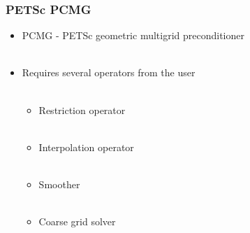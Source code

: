 \documentclass{beamer}
\begin{document}
\begin{frame}
\begin{center}
\frametitle{PETSc PCMG}

\begin{itemize}

\item PCMG - PETSc geometric multigrid preconditioner\\

~\\

\item Requires several operators from the user\\

~\\

\begin{itemize}

\item Restriction operator\\

~\\

\item Interpolation operator\\

~\\

\item Smoother\\

~\\

\item Coarse grid solver

\end{itemize}

\end{itemize}

\end{center}
\end{frame}

\end{document}
